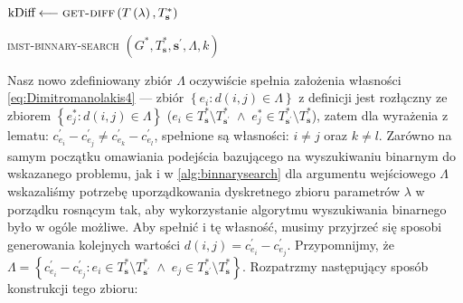 {\begin{pseudokod}[!htbp]
{{			$\text{kDiff} \longleftarrow \textsc{get-diff} \left( T \left( \lambda \right), T^{\ast}_{\textbf{s}} \right)$
		}
	}
	\caption{\textsc{imst-binnary-search} $\left( G^{\ast}, T^{\ast}_{\textbf{s}}, \textbf{s}^{\prime}, \Lambda, k \right)$}
	\label{alg:binnarysearch}
\end{pseudokod}

Nasz nowo zdefiniowany zbiór $\Lambda$ oczywiście spełnia założenia własności \ref{eq:Dimitromanolakis4} --- zbiór $\left\{ e_{i} : d \left( i, j \right) \in \Lambda \right\}$ z definicji jest rozłączny ze zbiorem $\left\{ e^{\ast}_{j} : d \left( i, j \right) \in \Lambda \right\}$ ($e_{i} \in T^{\ast}_{\textbf{s}} \setminus T^{\ast}_{\textbf{s}^{\prime}} \; \wedge \; e^{\ast}_{j} \in T^{\ast}_{\textbf{s}^{\prime}} \setminus T^{\ast}_{\textbf{s}}$), zatem dla wyrażenia z lematu: $c^{\prime}_{e_{i}} - c^{\prime}_{e_{j}} \neq c^{\prime}_{e_{k}} - c^{\prime}_{e_{l}}$, spełnione są własności: $i \neq j$ oraz $k \neq l$. Zarówno na samym początku omawiania podejścia bazującego na wyszukiwaniu binarnym do wskazanego problemu, jak i w \ref{alg:binnarysearch} dla argumentu wejściowego $\Lambda$ wskazaliśmy potrzebę uporządkowania dyskretnego zbioru parametrów $\lambda$ w porządku rosnącym tak, aby wykorzystanie algorytmu wyszukiwania binarnego było w ogóle możliwe. Aby spełnić i tę własność, musimy przyjrzeć się sposobi generowania kolejnych wartości $d \left( i, j \right) = c^{\prime}_{e_{i}} - c^{\prime}_{e_{j}}$. Przypomnijmy, że $\Lambda = \left\{ c^{\prime}_{e_{i}} - c^{\prime}_{e_{j}} : e_{i} \in T^{\ast}_{\textbf{s}} \setminus T^{\ast}_{\textbf{s}^{\prime}} \; \wedge \; e_{j} \in T^{\ast}_{\textbf{s}^{\prime}} \setminus T^{\ast}_{\textbf{s}} \right\}$. Rozpatrzmy następujący sposób konstrukcji tego zbioru:

}
